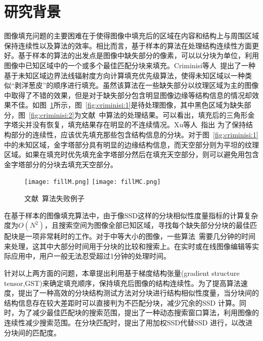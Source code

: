  \section{研究背景}
 \label{background}
 图像填充问题的主要困难在于使得图像中填充后的区域在内容和结构上与周围区域保持连续性以及算法的效率。相比而言，基于样本的算法在处理结构连续性方面更好。基于样本的算法的出发点是图像中缺失部分的像素，可以以分块为单位，利用图像中已知区域中的一个或多个最佳匹配分块来填充。Criminisi等人~\cite{Criminisi04regionfilling}提出了一种基于未知区域边界法线辐射度方向计算填充优先级算法，使得未知区域以一种类似``剥洋葱皮''的顺序进行填充。虽然该算法在一些缺失部分以纹理区域为主的图像中取得了不错的效果，但是对于缺失部分包含明显图像边缘等结构信息的情况却效果不佳。如图~\ref{fig:criminisi}所示，图~\ref{fig:criminisi:1}是待处理图像，其中黑色区域为缺失部分，图~\ref{fig:criminisi:2}为文献~中算法的处理结果。可以看出，填充后的三角形金字塔尖并没有恢复，填充结果存在明显的不连续情况。Xu等人~\cite{Xu:2010}指出 为了保持结构部分的连续性，应该优先填充那些包含结构信息的分块。对于图~\ref{fig:criminisi:1}中的未知区域，金字塔部分具有明显的边缘结构信息，而天空部分则为平坦的纹理区域。如果在填充时优先填充金字塔部分然后在填充天空部分，则可以避免用包含金字塔部分的分块去填充天空部分。\par
 \begin{figure}[htb]
   \centering%
     {\texttt{[image: fillM.png]}}%
  \hspace{1em}%
       {\texttt{[image: fillMC.png]}}
   \caption{文献~算法失败例子}
   \label{fig:criminisi}
 \end{figure}
 在基于样本的图像填充算法中，由于像SSD这样的分块相似性度量指标的计算复杂度为$O(N^2)$，且搜索空间为图像全部已知区域，寻找每个缺失部分分块的最佳匹配块是一项非常耗时的工作。对于中等大小的图像，一些算法~\cite{Xu:2010}需要几分钟的时间来处理，这其中大部分时间用于分块的比较和搜索上。在实时或在线图像编辑等实际应用中，用户一般无法忍受超过1分钟的处理时间。\par
 针对以上两方面的问题，本章提出利用基于梯度结构张量(gradient structure tensor,GST)来确定填充顺序，保持填充后图像的结构连续性。为了提高算法速度，提出了一种高效的分块结构测试方法对分块进行结构相似性度量，当分块间的结构信息存在较大差距时可以直接判为不匹配分块，减少冗余的SSD 计算。同时，为了减少最佳匹配块的搜索范围，提出了一种动态搜索窗口算法，利用图像的连续性减少搜索范围。在分块匹配时，提出了用加权SSD代替SSD 进行，以改进分块间的匹配度。
